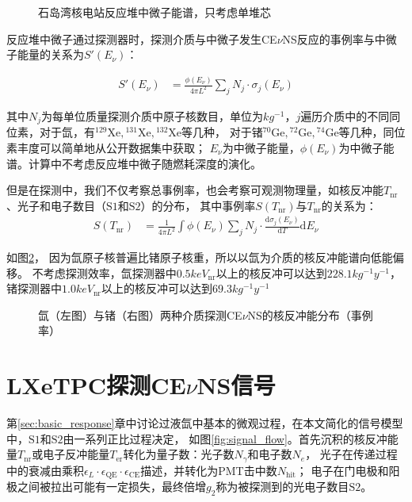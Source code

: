 \begin{figure}
    \centering
    
    \caption{\label{fig:neutrino_flux_spectrum} 石岛湾核电站反应堆中微子能谱，只考虑单堆芯}
\end{figure}

反应堆中微子通过探测器时，探测介质与中微子发生CE$\nu$NS反应的事例率与中微子能量的关系为$S'(E_\nu)$：

\begin{align}
    \label{eq:sevent_rate}
    S'(E_\nu) &= \frac{\phi(E_\nu)}{4\pi L^2}\sum_j N_j\cdot \sigma_j(E_\nu)
\end{align}

其中$N_j$为每单位质量探测介质中原子核数目，单位为$\si{kg^{-1}}$，$j$遍历介质中的不同同位素，对于氙，有${}^{129}\mathrm{Xe},{}^{131}\mathrm{Xe},{}^{132}\mathrm{Xe}$等几种，
对于锗${}^{70}\mathrm{Ge},{}^{72}\mathrm{Ge},{}^{74}\mathrm{Ge}$等几种，同位素丰度可以简单地从公开数据集中获取；
$E_\nu$为中微子能量，$\phi(E_\nu)$为中微子能谱。计算中不考虑反应堆中微子随燃耗深度的演化。

但是在探测中，我们不仅考察总事例率，也会考察可观测物理量，如核反冲能$T_{\mathrm{nr}}$、光子和电子数目（$\mathrm{S1}$和$\mathrm{S2}$）的分布，
其中事例率$S(T_{\mathrm{nr}})$与$T_{\mathrm{nr}}$的关系为：
\begin{align}
    \label{eq:tnr_event_rate}
    S(T_{\mathrm{nr}}) &= \frac{1}{4\pi L^2}\int\phi(E_\nu)\sum_j N_j\cdot \frac{\mathrm{d}\sigma_j(E_\nu)}{\mathrm{d}T}\mathrm{d}E_\nu
\end{align}

如图\ref{fig:cevns_event_rate}，
因为氙原子核普遍比锗原子核重，所以以氙为介质的核反冲能谱向低能偏移。
不考虑探测效率，氙探测器中$0.5\si{keV_{\mathrm{nr}}}$以上的核反冲可以达到$228.1\si{kg^{-1}y^{-1}}$，
锗探测器中$1.0\si{keV_{\mathrm{nr}}}$以上的核反冲可以达到$69.3\si{kg^{-1}y^{-1}}$

\begin{figure}
    \centering
    
    \caption{\label{fig:cevns_event_rate} 氙（左图）与锗（右图）两种介质探测CE$\nu$NS的核反冲能分布（事例率）}
\end{figure}

\section{LXeTPC探测CE$\nu$NS信号}
\label{sec:lxe_signal}

第\ref{sec:basic_response}章中讨论过液氙中基本的微观过程，在本文简化的信号模型中，$\mathrm{S1}$和$\mathrm{S2}$由一系列正比过程决定，
如图\ref{fig:signal_flow}。首先沉积的核反冲能量$T_{\mathrm{nr}}$或电子反冲能量$T_{\mathrm{er}}$转化为量子数：光子数$N_\gamma$和电子数$N_e$，
光子在传递过程中的衰减由乘积$\epsilon_L\cdot\epsilon_\mathrm{QE}\cdot\epsilon_\mathrm{CE}$描述，并转化为PMT击中数$N_\mathrm{hit}$；
电子在门电极和阳极之间被拉出可能有一定损失，最终倍增$g_2$称为被探测到的光电子数目$\mathrm{S2}$。

